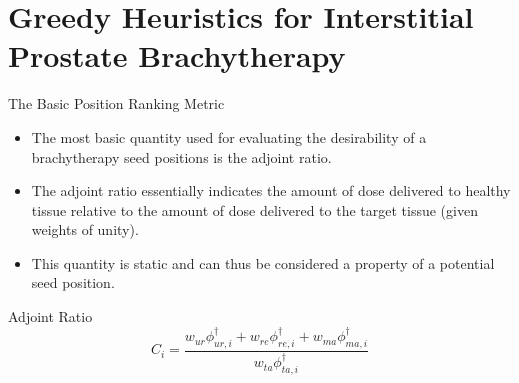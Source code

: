 \documentclass{beamer}
\begin{document}
\section{Greedy Heuristics for Interstitial Prostate Brachytherapy}
\begin{frame}{The Basic Position Ranking Metric}
  
  \begin{itemize}
    \item The most basic quantity used for evaluating the desirability of a
      brachytherapy seed positions is the adjoint ratio.
      \medskip
    \item The adjoint ratio essentially indicates the amount of dose delivered 
      to healthy tissue relative to the amount of dose delivered to the target
      tissue (given weights of unity). 
      \medskip
    \item This quantity is static and can thus be considered a property of a
      potential seed position.
      \medskip
  \end{itemize}
  
  \begin{beamerboxesrounded}[upper=boxheadcolor,lower=boxbodycolor,shadow=true]{Adjoint Ratio}
    \begin{equation*}
      C_{i} = \frac{w_{ur}\phi_{ur,i}^{\dagger}+w_{re}\phi_{re,i}^{\dagger}+w_{ma}\phi_{ma,i}^{\dagger}}{w_{ta}\phi_{ta,i}^{\dagger}}
    \end{equation*}
  \end{beamerboxesrounded}
  
\end{frame}
\end{document}
